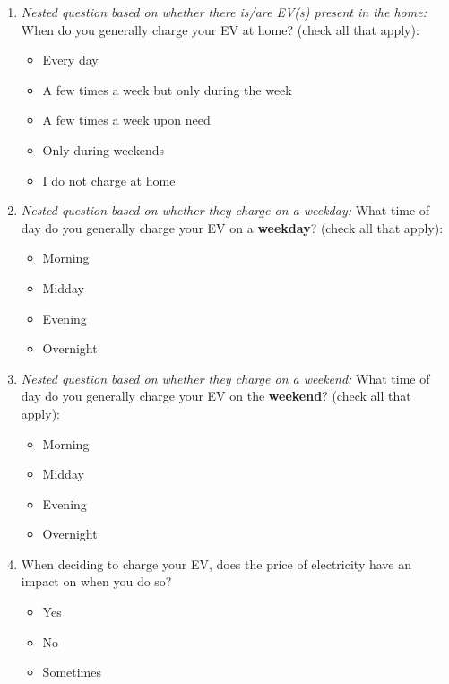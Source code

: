 \documentclass{article}
\begin{document}
\begin{enumerate}
\item \textit{Nested question based on whether there is/are EV(s) present in the home:}
When do you generally charge your EV at home? (check all that apply):
\begin{itemize}
  \item[\checkbox] Every day
  \item[\checkbox] A few times a week but only during the week
  \item[\checkbox] A few times a week upon need
  \item[\checkbox] Only during weekends
  \item[\checkbox] I do not charge at home
\end{itemize}
 

\item \textit{Nested question based on whether they charge on a weekday:}
What time of day do you generally charge your EV on a \textbf{weekday}? (check all that apply):
\begin{itemize}
  \item[\checkbox] Morning
  \item[\checkbox] Midday
  \item[\checkbox] Evening
  \item[\checkbox] Overnight
\end{itemize}
 

\item \textit{Nested question based on whether they charge on a weekend:}
What time of day do you generally charge your EV on the \textbf{weekend}? (check all that apply):
\begin{itemize}
  \item[\checkbox] Morning
  \item[\checkbox] Midday
  \item[\checkbox] Evening
  \item[\checkbox] Overnight
\end{itemize}
 

\item When deciding to charge your EV, does the price of electricity have an impact on when you do so?
\begin{itemize}
  \item[\checkbox] Yes
  \item[\checkbox] No
  \item[\checkbox] Sometimes
\end{itemize}
 


\end{enumerate}
\end{document}
